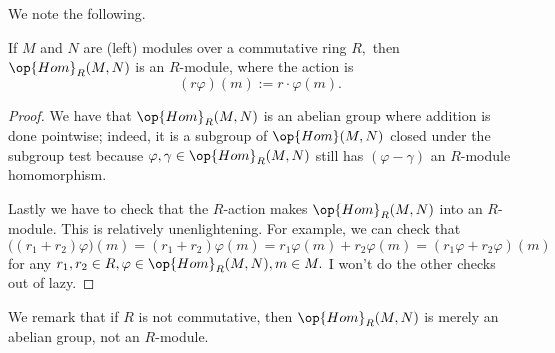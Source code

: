 \documentclass[../notes.tex]{subfiles}
\begin{document}
We note the following.
\begin{proposition}
	If $M$ and $N$ are (left) modules over a commutative ring $R,$ then $\op{Hom}_R(M,N)$ is an $R$-module, where the action is
	\[(r\varphi)(m):=r\cdot\varphi(m).\]
\end{proposition}
\begin{proof}
	We have that $\op{Hom}_R(M,N)$ is an abelian group where addition is done pointwise; indeed, it is a subgroup of $\op{Hom}(M,N)$ closed under the subgroup test because $\varphi,\gamma\in\op{Hom}_R(M,N)$ still has $(\varphi-\gamma)$ an $R$-module homomorphism.

	Lastly we have to check that the $R$-action makes $\op{Hom}_R(M,N)$ into an $R$-module. This is relatively unenlightening. For example, we can check that
	\[\big((r_1+r_2)\varphi\big)(m)=(r_1+r_2)\varphi(m)=r_1\varphi(m)+r_2\varphi(m)=(r_1\varphi+r_2\varphi)(m)\]
	for any $r_1,r_2\in R,\varphi\in\op{Hom}_R(M,N),m\in M.$ I won't do the other checks out of lazy.
\end{proof}
We remark that if $R$ is not commutative, then $\op{Hom}_R(M,N)$ is merely an abelian group, not an $R$-module.
\end{document}
